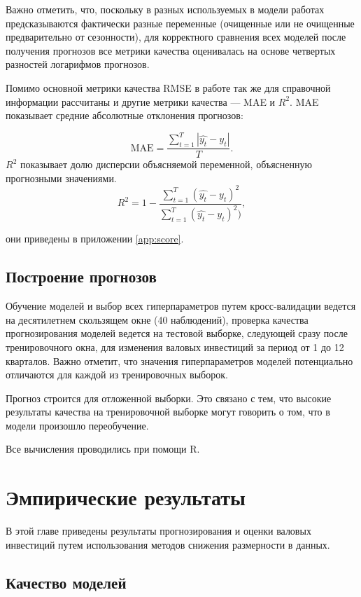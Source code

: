 Важно отметить, что, поскольку в разных используемых в модели работах предсказываются фактически разные переменные (очищенные или не очищенные предварительно от сезонности), для корректного сравнения всех моделей после получения прогнозов все метрики качества оценивалась на основе четвертых разностей логарифмов прогнозов.

Помимо основной метрики качества RMSE в работе так же для справочной информации рассчитаны и другие метрики качества --- MAE и $R^2$.
MAE показывает средние абсолютные отклонения прогнозов:

\begin{equation}
    \text{MAE} =  \frac{\sum_{t = 1}^{T} |\hat{y_t} - y_t|}{T}.
\end{equation}
$R^2$ показывает долю дисперсии объясняемой переменной, объясненную прогнозными значениями.
\begin{equation}
    R^2 = 1 -\frac{ \sum_{t = 1}^{T}(\hat{y_t} - y_t)^2}{\sum_{t = 1}^{T}(\hat{y_t} - y_t)^2)},
\end{equation}

они приведены в приложении \ref{app:score}.

\section{Построение прогнозов}

Обучение моделей и выбор всех гиперпараметров путем кросс-валидации ведется на десятилетнем скользящем окне (40 наблюдений), проверка качества прогнозирования моделей ведется на тестовой выборке, следующей сразу после тренировочного окна, для изменения валовых инвестиций за период от 1 до 12 кварталов. Важно отметит, что значения гиперпараметров моделей потенциально отличаются для каждой из тренировочных выборок. 

Прогноз строится для отложенной выборки. Это связано с тем, что высокие результаты качества на тренировочной выборке могут говорить о том, что в модели произошло переобучение.

Все вычисления проводились при помощи R.

\chapter{Эмпирические результаты}\label{ch:results}
В этой главе приведены результаты прогнозирования и оценки валовых инвестиций путем использования методов снижения размерности в данных.
\section{Качество моделей}

